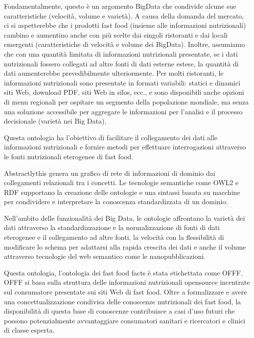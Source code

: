 Fondamentalmente, questo è un argomento BigData che condivide alcune sue caratteristiche (velocità, volume e varietà). A causa della domanda del mercato, ci si aspetterebbe che i prodotti fast food (insieme alle informazioni nutrizionali) cambino e aumentino anche con più scelte dai singoli ristoranti e dai locali emergenti (caratteristiche di velocità e volume dei BigData). Inoltre, assumiamo che con una quantità limitata di informazioni nutrizionali presentate, se i dati nutrizionali fossero collegati ad altre fonti di dati esterne estese, la quantità di dati aumenterebbe prevedibilmente ulteriormente. Per molti ristoranti, le informazioni nutrizionali sono presentate in formati variabili: statici e dinamici siti Web, download PDF, siti Web in silos, ecc., e sono disponibili anche opzioni di menu regionali per ospitare un segmento della popolazione mondiale, ma senza una soluzione accessibile per aggregare le informazioni per l'analisi e il processo decisionale (varietà nei Big Data). 

Questa ontologia ha l'obiettivo di facilitare il collegamento dei dati alle informazioni nutrizionali e fornire metodi per effettuare interrogazioni attraverso le fonti nutrizionali eterogenee di fast food. 

Abstractlythis genera un grafico di rete di informazioni di dominio dai collegamenti relazionali tra i concetti. Le tecnologie semantiche come OWL2 e RDF supportano la creazione delle ontologie e una sintassi basata su macchine per condividere e interpretare la conoscenza standardizzata di un dominio. 

Nell'ambito delle funzionalità dei Big Data, le ontologie affrontano la varietà dei dati attraverso la standardizzazione e la normalizzazione di fonti di dati eterogenee e il collegamento ad altre fonti, la velocità con la flessibilità di modificare lo schema per adattarsi alla rapida crescita dei dati e anche il volume attraverso tecnologie del web semantico come le nanopubblicazioni. 

Questa ontologia, l'ontologia dei fast food facts è stata etichettata come OFFF. OFFF si basa sulla struttura delle informazioni nutrizionali opensource incentrate sul consumatore presentate sui siti Web di fast food. Oltre a formalizzare e avere una concettualizzazione condivisa delle conoscenze nutrizionali dei fast food, la disponibilità di questa base di conoscenze contribuisce a casi d'uso futuri che possono potenzialmente avvantaggiare consumatori sanitari e ricercatori e clinici di classe esperta.



